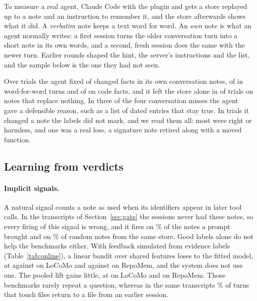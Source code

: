 To measure a real agent, Claude Code with the plugin and  gets a store replayed up to a note and an instruction to remember it, and the store afterwards shows what it did. A \emph{verbatim} note keeps a text word for word. An \emph{own} note is what an agent normally writes: a first session turns the older conversation turn into a short note in its own words, and a second, fresh session does the same with the newer turn. Earlier rounds shaped the hint, the server's instructions and the list, and the sample below is the one they had not seen.

Over  trials the agent fixed  of  changed facts in its own conversation notes,  of  in word-for-word turns and  of  on code facts, and it left the store alone in  of  trials on notes that replace nothing. In three of the four conversation misses the agent gave a defensible reason, such as a list of dated entries that stay true. In  trials it changed a note the labels did not mark, and we read them all: most were right or harmless, and one was a real loss, a signature note retired along with a moved function.

\begin{table}[!htb]\centering\scriptsize
\caption{The write path without keys. Changed notes, how often the older version is first or anywhere on the list of up to five, how often a list appears on notes that replace nothing, stale injection at $B=1024$ now and with a simulated oracle agent, and the tokens of a list.}\label{tab:writepath}
\resizebox{\columnwidth}{!}{}
\end{table}

\subsection{Learning from verdicts}\label{sec:verdicts}
\paragraph{Implicit signals.} A natural signal counts a note as used when its identifiers appear in later tool calls. In the transcripts of Section~\ref{sec:gate} the sessions never had these notes, so every firing of this signal is wrong, and it fires on \% of the notes a prompt brought and on \% of random notes from the same store. Good labels alone do not help the benchmarks either. With feedback simulated from evidence labels (Table~\ref{tab:online}), a linear bandit over shared features loses to the fitted model, at  against  on LoCoMo and  against  on RepoMem, and the system does not use one. The pooled lift gains little, at  on LoCoMo and  on RepoMem. Those benchmarks rarely repeat a question, whereas in the same transcripts \% of turns that touch files return to a file from an earlier session.

